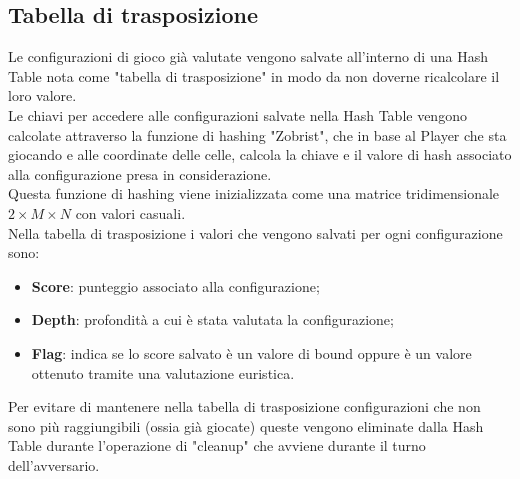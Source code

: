 \subsection{Tabella di trasposizione}
Le configurazioni di gioco già valutate vengono salvate all'interno di una Hash Table nota come "tabella di trasposizione" in modo da non doverne ricalcolare il loro valore.\\
Le chiavi per accedere alle configurazioni salvate nella Hash Table vengono calcolate attraverso la funzione di hashing "Zobrist", che in base al Player che sta giocando e alle coordinate delle celle, calcola la chiave e il valore di hash associato alla configurazione presa in considerazione.\\
Questa funzione di hashing viene inizializzata come una matrice tridimensionale $ 2 \times M \times N $ con valori casuali.\\
Nella tabella di trasposizione i valori che vengono salvati per ogni configurazione sono:
\begin{itemize}
    \item \textbf{Score}: punteggio associato alla configurazione;
    \item \textbf{Depth}: profondità a cui è stata valutata la configurazione;
    \item \textbf{Flag}: indica se lo score salvato è un valore di bound oppure è un valore ottenuto tramite una valutazione euristica.
\end{itemize}
Per evitare di mantenere nella tabella di trasposizione configurazioni che non sono più raggiungibili (ossia già giocate) queste vengono eliminate dalla Hash Table durante l'operazione di "cleanup" che avviene durante il turno dell'avversario.